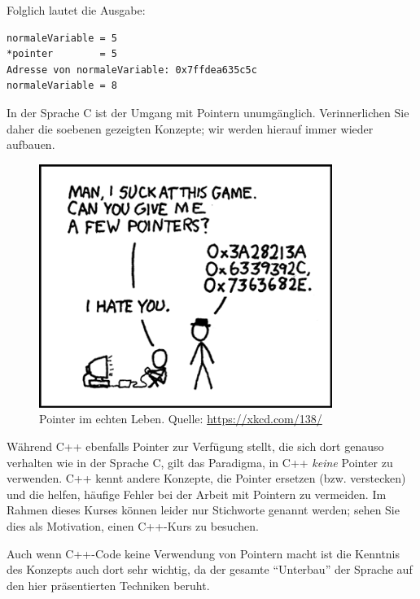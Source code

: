 Folglich lautet die Ausgabe:

\begin{cmdbox}
\begin{verbatim}
normaleVariable = 5
*pointer        = 5
Adresse von normaleVariable: 0x7ffdea635c5c
normaleVariable = 8
\end{verbatim}
\end{cmdbox}

\begin{warnbox}
In der Sprache C ist der Umgang mit Pointern unumgänglich. Verinnerlichen Sie daher die soebenen gezeigten Konzepte; wir werden hierauf immer wieder aufbauen.
\end{warnbox}

\FloatBarrier
\begin{figure}
\begin{center}
\includegraphics[width=.5\linewidth]{./gfx/xkcd-pointers}
\caption[Pointer im echten Leben]{Pointer im echten Leben. Quelle: \url{https://xkcd.com/138/}}
\end{center}
\end{figure}
\FloatBarrier

\begin{plusbox}
Während C++ ebenfalls Pointer zur Verfügung stellt, die sich dort genauso verhalten wie in der Sprache C, gilt das Paradigma, in C++ \emph{keine} Pointer zu verwenden. C++ kennt andere Konzepte, die Pointer ersetzen (bzw. verstecken) und die helfen, häufige Fehler bei der Arbeit mit Pointern zu vermeiden. Im Rahmen dieses Kurses können leider nur Stichworte genannt werden; sehen Sie dies als Motivation, einen C++-Kurs zu besuchen.

Auch wenn C++-Code \idR keine Verwendung von Pointern macht ist die Kenntnis des Konzepts auch dort sehr wichtig, da der gesamte \enquote{Unterbau} der Sprache auf den hier präsentierten Techniken beruht.
\end{plusbox}

